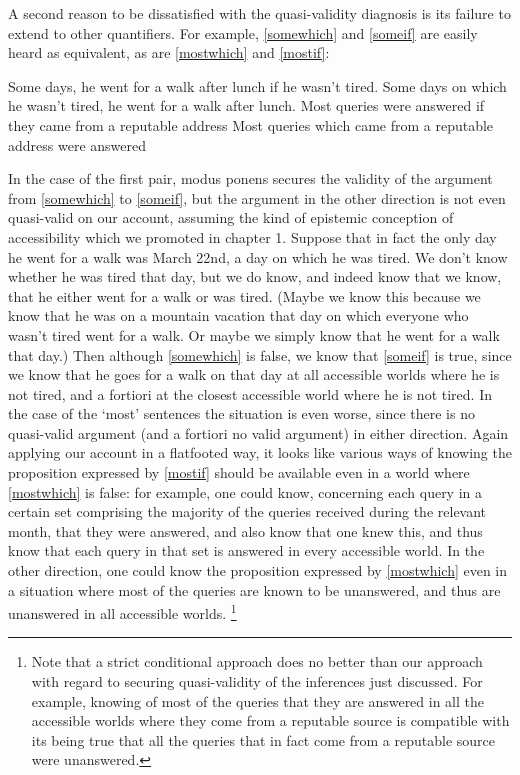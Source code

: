 \documentclass[If.tex]{subfiles}
\begin{document}
A second reason to be dissatisfied with the quasi-validity diagnosis is its failure to extend to other quantifiers.  For example, \ref{somewhich} and \ref{someif} are easily heard as equivalent, as are \ref{mostwhich} and \ref{mostif}:
\begin{prop}
	\nitem \label{someif}
	Some days, he went for a walk after lunch if he wasn't tired.
	\nitem \label{somewhich}
	Some days on which he wasn't tired, he went for a walk after lunch.
	\nitem \label{mostif}
	Most queries were answered if they came from a reputable address
	\nitem \label{mostwhich}
	Most queries which came from a reputable address were answered
\end{prop}
In the case of the first pair, modus ponens secures the validity of the argument from \ref{somewhich} to \ref{someif}, but the argument in the other direction is not even quasi-valid on our account, assuming the kind of epistemic conception of accessibility which we promoted in chapter 1.  Suppose that in fact the only day he went for a walk was March 22nd, a day on which he was tired.  We don't know whether he was tired that day, but we do know, and indeed know that we know, that he either went for a walk or was tired.  (Maybe we know this because we know that he was on a mountain vacation that day on which everyone who wasn't tired went for a walk.  Or maybe we simply know that he went for a walk that day.)  Then although \ref{somewhich} is false, we know that \ref{someif} is true, since we know that he goes for a walk on that day at all accessible worlds where he is not tired, and a fortiori at the closest accessible world where he is not tired.  In the case of the ‘most’ sentences the situation is even worse, since there is no quasi-valid argument (and a fortiori no valid argument) in either direction.  Again applying our account in a flatfooted way, it looks like various ways of knowing the proposition expressed by \ref{mostif} should be available even in a world where \ref{mostwhich} is false: for example, one could know, concerning each query in a certain set comprising the majority of the queries received during the relevant month, that they were answered, and also know that one knew this, and thus know that each query in that set is answered in every accessible world.  In the other direction, one could know the proposition expressed by \ref{mostwhich} even in a situation where most of the queries are known to be unanswered, and thus are unanswered in all accessible worlds.%
\footnote{Note that a strict conditional approach does no better than our approach with regard to securing quasi-validity of the inferences just discussed.  For example, knowing of most of the queries that they are answered in all the accessible worlds where they come from a reputable source is compatible with its being true that all the queries that in fact come from a reputable source were unanswered.}  
\end{document}
